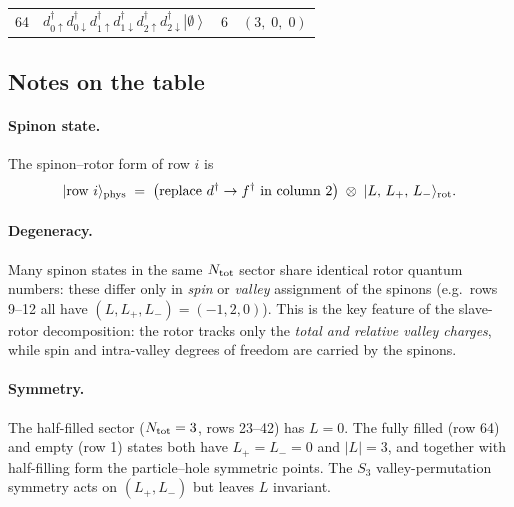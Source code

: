 \documentclass[11pt,a4paper]{article}
\newcommand{\ua}{\uparrow}
\newcommand{\da}{\downarrow}
\newcommand{\ket}[1]{\left|#1\right\rangle}
\newcommand{\empt}{\ket{\emptyset}}
\newcommand{\ddag}{d^{\dagger}}
\begin{document}
{\begin{longtable}{rp{8.6cm}cc}
\rowcolor{gray!10}
64 & $\ddag_{0\ua}\ddag_{0\da}\ddag_{1\ua}\ddag_{1\da}\ddag_{2\ua}\ddag_{2\da}\empt$
   & 6 & $(3,\;0,\;0)$ \\

\end{longtable}
}%

\subsection*{Notes on the table}

\paragraph{Spinon state.}
The spinon--rotor form of row $i$ is
\begin{equation}
  |\text{row }i\rangle_{\rm phys}
  \;=\;
  \bigl(\text{replace }d^{\dagger}\to f^{\dagger}
        \text{ in column 2}\bigr)
  \;\otimes\;
  |L,\,L_+,\,L_-\rangle_{\rm rot}.
\end{equation}

\paragraph{Degeneracy.}
Many spinon states in the same $N_{\rm tot}$ sector share identical rotor
quantum numbers: these differ only in \emph{spin} or \emph{valley} assignment
of the spinons (e.g.\ rows 9--12 all have $(L,L_+,L_-)=(-1,2,0)$).
This is the key feature of the slave-rotor decomposition: the rotor tracks only
the \emph{total and relative valley charges}, while spin and intra-valley
degrees of freedom are carried by the spinons.

\paragraph{Symmetry.}
The half-filled sector ($N_{\rm tot}=3$, rows 23--42) has $L=0$.
The fully filled (row 64) and empty (row 1) states both have
$L_+=L_-=0$ and $|L|=3$, and together with half-filling form the particle--hole
symmetric points.
The $S_3$ valley-permutation symmetry acts on $(L_+,L_-)$ but leaves $L$ invariant.
\end{document}
